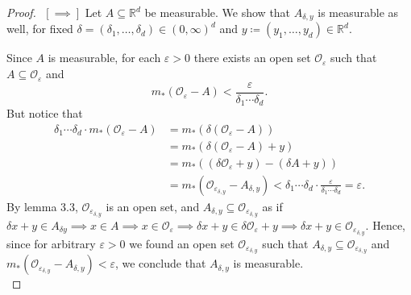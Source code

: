 \begin{proof}$ $\newline
	\( [\implies ] \) Let \( A \subseteq \mathbb{R}^{d}  \) be measurable. We show that \( A_{\delta ,y}  \) is measurable as well, for fixed \( \delta = (\delta_1, \hdots , \delta_d) \in (0, \infty)^{d}  \) and \( y \coloneqq (y_1, \hdots , y_d) \in \mathbb{R}^{d}  \).

	Since \( A \) is measurable, for each \( \varepsilon > 0 \) there exists an open set \( \mathcal{O} _\varepsilon  \) such that \(A \subseteq  \mathcal{O} _\varepsilon  \) and \[ m_*(\mathcal{O} _\varepsilon  - A) < \frac{\varepsilon }{\delta_1\cdots \delta_d} \tag{\delta_1\cdots \delta _d > 0} . \] But notice that
\begin{align*}
	\delta_1\cdots	\delta _d \cdot m_*(\mathcal{O} _\varepsilon - A) &= m_*(\delta (\mathcal{O} _\varepsilon - A)) \tag{Lemma 3.2}\\	
					  &= m_*(\delta (\mathcal{O} _ \varepsilon - A) + y) \tag{Lemma 3.1}\\
					  &=m_*((\delta \mathcal{O} _\varepsilon +y) - (\delta A + y)) \tag {Lemma 3.4} \\
					  &= m_*(\mathcal{O}_{\varepsilon _{\delta ,y} }  - A_{\delta, y} ) < \delta_1\cdots \delta_d\cdot \frac{\varepsilon }{\delta_1 \cdots \delta_d  } = \varepsilon   \tag{by measurability of \( A \) } .
\end{align*}
By lemma 3.3, \( \mathcal{O}_{\varepsilon _{\delta ,y} }   \) is an open set, and \( A_{\delta , y} \subseteq \mathcal{O}_{\varepsilon _{\delta ,y} }     \) as if \( \delta x + y \in A_{\delta y} \implies x \in A \implies x \in \mathcal{O} _\varepsilon \implies \delta x + y \in \delta \mathcal{O} _{\varepsilon} + y \implies \delta x + y \in \mathcal{O}_{\varepsilon _{\delta ,y} }    \). Hence, since for arbitrary \( \varepsilon >0 \) we found an open set \( \mathcal{O} _{\varepsilon _{\delta ,y} }  \) such that \( A_{\delta ,y} \subseteq \mathcal{O} _{\varepsilon _{\delta ,y} }   \) and \( m_*(\mathcal{O} _{\varepsilon _{\delta ,y} } - A_{\delta ,y} ) < \varepsilon  \), we conclude that \( A_{\delta ,y}  \) is measurable. \\


\end{proof}
